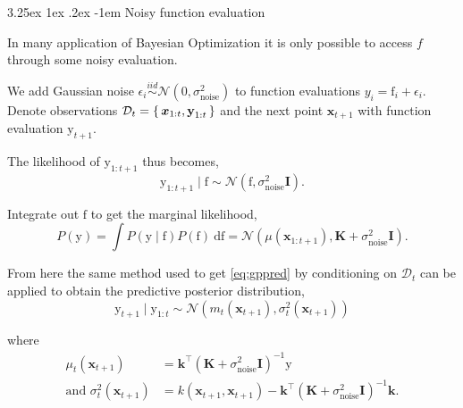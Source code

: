 \documentclass[conference,compsoc]{IEEEtran}
\makeatletter
\def\paragraph{\@startsection{paragraph}{4}{\z@}%
                                    {3.25ex \@plus1ex \@minus.2ex}%
                                    {-1em}%
                                    {\normalfont\normalsize\bfseries}}
\theoremstyle{definition}
\makeatother
\begin{document}
            \paragraph{Noisy function evaluation}

                In many application of Bayesian Optimization it is only possible to access $f$ through some noisy evaluation.

                We add Gaussian noise $\epsilon_i \stackrel{iid}\sim \mathcal{N}(0,\sigma_{\mathrm{noise}}^2)$ to function evaluations $y_i = \mathrm{f}_i+ \epsilon_i$. Denote observations $\mathcal{D}_t = \set{\bm{x}_{1:t}, \bm{\mathrm{y}}_{1:t}}$ and the next point $\bm{x}_{t+1}$ with function evaluation $\bm{\mathrm{y}}_{t+1}$.
                
                The likelihood of $\bm{\mathrm{y}}_{1:t+1}$ thus becomes,
                    \begin{equation}
                        \bm{\mathrm{y}}_{1:t+1} \mid \bm{\mathrm{f}} \sim \mathcal{N}(\bm{\mathrm{f}}, \sigma_{\mathrm{noise}}^2 \bm{I}).
                    \end{equation} 

                Integrate out $\bm{\mathrm{f}}$ to get the marginal likelihood,
                    \begin{equation}
                        P(\bm{\mathrm{y}}) 
                    = \int P(\bm{\mathrm{y}}\mid \bm{\mathrm{f}})P(\bm{\mathrm{f}})\ \mathrm{d} \bm{\mathrm{f}} 
                    = \mathcal{N}(\mu(\bm{x}_{1:t+1}), \bm{K} + \sigma_{\mathrm{noise}}^2 \bm{I}).
                    \end{equation}

                From here the same method used to get \eqref{eq:gppred} by conditioning on $\mathcal{D}_t$ can be applied to obtain the predictive posterior distribution,
                    \begin{equation}
                        \mathrm{y}_{t+1} \mid \bm{\mathrm{y}}_{1:t} \sim \mathcal{N}(m_{t}(\bm{x}_{t+1}), \sigma_{t}^2(\bm{x}_{t+1}))
                    \end{equation}

                where
                    \begin{align}
                        \mu_t(\bm{x}_{t+1})          &= \bm{k}^\top (\bm{K} + \sigma_{\mathrm{noise}}^2 \bm{I})^{-1} \bm{\mathrm{y}}\label{eq:gppredmu} \\
                        \text{and }\sigma_t^2(\bm{x}_{t+1}) &= k(\bm{x}_{t+1}, \bm{x}_{t+1}) - \bm{k}^\top (\bm{K} + \sigma_{\mathrm{noise}}^2 \bm{I})^{-1} \bm{k}.\label{eq:gppredsigma}
                    \end{align}
                    
\end{document}
